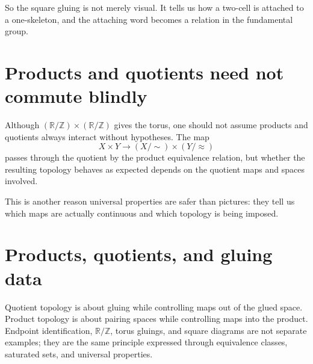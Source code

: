 So the square gluing is not merely visual.  It tells us how a two-cell is attached to a one-skeleton, and the attaching word becomes a relation in the fundamental group.

\section{Products and quotients need not commute blindly}

Although \((\mathbb R/\mathbb Z)\times(\mathbb R/\mathbb Z)\) gives the torus, one should not assume products and quotients always interact without hypotheses.  The map
\[
  X\times Y\to (X/{\sim})\times(Y/{\approx})
\]
passes through the quotient by the product equivalence relation, but whether the resulting topology behaves as expected depends on the quotient maps and spaces involved.

This is another reason universal properties are safer than pictures: they tell us which maps are actually continuous and which topology is being imposed.

\section{Products, quotients, and gluing data}

Quotient topology is about gluing while controlling maps out of the glued space.  Product topology is about pairing spaces while controlling maps into the product.  Endpoint identification, \(\mathbb R/\mathbb Z\), torus gluings, and square diagrams are not separate examples; they are the same principle expressed through equivalence classes, saturated sets, and universal properties.
